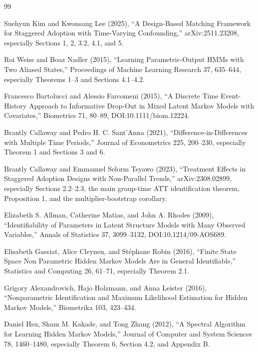 \documentclass{article}
\begin{document}
\begin{thebibliography}{99}

   Suehyun Kim and Kwonsang Lee (2025), ``A Design-Based Matching Framework for Staggered Adoption with Time-Varying Confounding,'' arXiv:2511.23208, especially Sections 1, 2, 3.2, 4.1, and 5.

   Roi Weiss and Boaz Nadler (2015), ``Learning Parametric-Output HMMs with Two Aliased States,'' Proceedings of Machine Learning Research 37, 635--644, especially Theorems 1--3 and Sections 4.1--4.2.

   Francesco Bartolucci and Alessio Farcomeni (2015), ``A Discrete Time Event-History Approach to Informative Drop-Out in Mixed Latent Markov Models with Covariates,'' Biometrics 71, 80--89, DOI:10.1111/biom.12224.

   Brantly Callaway and Pedro H. C. Sant'Anna (2021), ``Difference-in-Differences with Multiple Time Periods,'' Journal of Econometrics 225, 200--230, especially Theorem 1 and Sections 3 and 6.

   Brantly Callaway and Emmanuel Selorm Tsyawo (2023), ``Treatment Effects in Staggered Adoption Designs with Non-Parallel Trends,'' arXiv:2308.02899, especially Sections 2.2--2.3, the main group-time ATT identification theorem, Proposition 1, and the multiplier-bootstrap corollary.

   Elizabeth S. Allman, Catherine Matias, and John A. Rhodes (2009), ``Identifiability of Parameters in Latent Structure Models with Many Observed Variables,'' Annals of Statistics 37, 3099--3132, DOI:10.1214/09-AOS689.

   Elisabeth Gassiat, Alice Cleynen, and Stéphane Robin (2016), ``Finite State Space Non Parametric Hidden Markov Models Are in General Identifiable,'' Statistics and Computing 26, 61--71, especially Theorem 2.1.

   Grigory Alexandrovich, Hajo Holzmann, and Anna Leister (2016), ``Nonparametric Identification and Maximum Likelihood Estimation for Hidden Markov Models,'' Biometrika 103, 423--434.

   Daniel Hsu, Sham M. Kakade, and Tong Zhang (2012), ``A Spectral Algorithm for Learning Hidden Markov Models,'' Journal of Computer and System Sciences 78, 1460--1480, especially Theorem 6, Section 4.2, and Appendix B.


\end{thebibliography}
\end{document}

